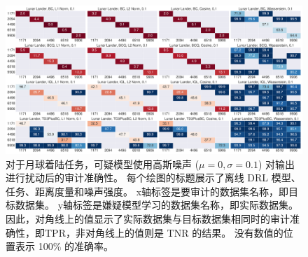     \begin{figure}[!t]
    \includegraphics[width=\hsize]{figure/orl_auditor/overall_sac_lunarlander_20230201161413988.pdf}
    \caption{
    对于月球着陆任务，可疑模型使用高斯噪声 ($\mu=0, \sigma=0.1$) 对输出进行扰动后的审计准确性。
    每个绘图的标题展示了离线 DRL 模型、任务、距离度量和噪声强度。
    x轴标签是要审计的数据集名称，即目标数据集。
    y轴标签是嫌疑模型学习的数据集名称，即实际数据集。
    因此，对角线上的值显示了实际数据集与目标数据集相同时的审计准确性，即TPR，非对角线上的值则是 TNR 的结果。
    没有数值的位置表示 100\% 的准确率。
    }
    \label{fig:robustness 0.1 on lunarlander}
    \end{figure}
    
